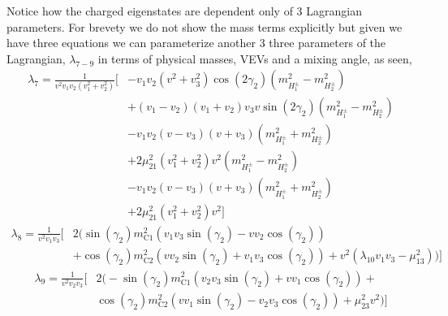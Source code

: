 Notice how the charged eigenstates are dependent only of 3 Lagrangian parameters. For brevety we do not show the mass terms explicitly but given we have three equations we can parameterize another 3 three parameters of the Lagrangian, $\lambda_{7-9}$ in terms of physical masses, VEVs and a mixing angle, as seen, 
\begin{equation}
\begin{split}
\lambda_7 = \frac{1}{v^2 v_1 v_2
   \left(v_1^2+v_2^2\right)} \Bigg[ & -v_1 v_2 \left(v^2+v_3^2\right) \cos \left(2 \gamma _2\right) \left( m_{H^\pm_1}^2 - m_{H^\pm_2}^2 \right) \\ & + \left(v_1-v_2\right) \left(v_1+v_2\right) v_3 v \sin \left(2 \gamma _2\right)
   \left( m_{H^\pm_1}^2  - m_{H^\pm_2}^2 \right) \\ & -v_1 v_2 \left(v-v_3\right) \left(v+v_3\right) \left( m_{H^\pm_1}^2 + m_{H^\pm_2}^2 \right)  \\ & +2 \mu_{21}^2 \left(v_1^2+v_2^2\right) v^2 
   \left( m_{H^\pm_1}^2 - m_{H^\pm_2}^2 \right)  \\ & -v_1 v_2 \left(v-v_3\right) \left(v+v_3\right)  \left( m_{H^\pm_1}^2 + m_{H^\pm_2}^2 \right) \\ & +2 \mu_{21}^2 \left(v_1^2+v_2^2\right) v^2 \Bigg] 
\end{split}
\end{equation}
%
\begin{equation}
\begin{split}
\lambda_8  = \frac{1}{v^2 v_1 v_3} \Bigg[ & 2 \Bigg(\sin \left(\gamma _2\right) m_{\text{C1}}^2 \left(v_1 v_3 \sin \left(\gamma _2\right)-v v_2 \cos \left(\gamma _2\right)\right) \\ & +\cos \left(\gamma _2\right) m_{\text{C2}}^2 \left(v v_2 \sin\left(\gamma _2\right)+v_1 v_3 \cos \left(\gamma _2\right)\right)+v^2 \left(\lambda _{10} v_1 v_3- \mu_{13}^2\right)\Bigg) \Bigg] 
\end{split}
\end{equation}
%
\begin{equation}
\begin{split}
\lambda_9 = \frac{1}{v^2 v_2 v_3} \Bigg[ & 2 \Bigg(-\sin \left(\gamma _2\right) m_{\text{C1}}^2 \left(v_2 v_3 \sin \left(\gamma _2\right)+v v_1 \cos \left(\gamma _2\right)\right)+ \\ & \cos \left(\gamma _2\right) m_{\text{C2}}^2 \left(v v_1 \sin \left(\gamma _2\right)-v_2 v_3 \cos \left(\gamma _2\right)\right)+\mu_{23}^2 v^2\Bigg) \Bigg] 
\end{split}
\end{equation}


